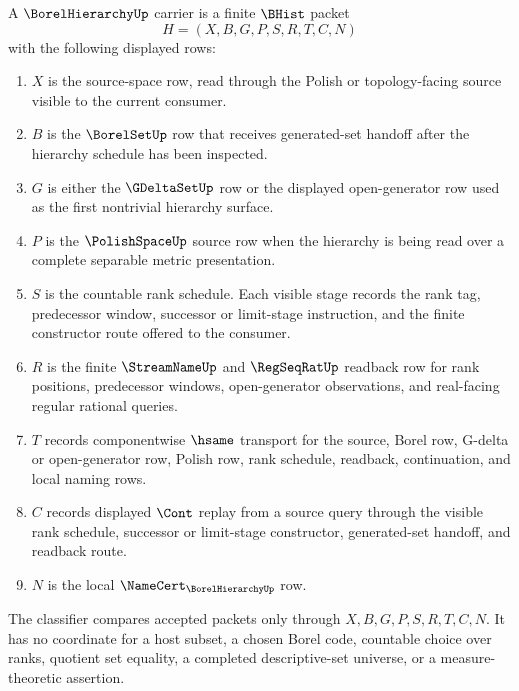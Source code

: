 \begin{definition}
\label{def:borel-hierarchy-carrier}
A $\BorelHierarchyUp$ carrier is a finite $\BHist$ packet
$$
H=(X,B,G,P,S,R,T,C,N)
$$
with the following displayed rows:
\begin{enumerate}
\item $X$ is the source-space row, read through the Polish or topology-facing source visible to the current consumer.
\item $B$ is the $\BorelSetUp$ row that receives generated-set handoff after the hierarchy schedule has been inspected.
\item $G$ is either the $\GDeltaSetUp$ row or the displayed open-generator row used as the first nontrivial hierarchy surface.
\item $P$ is the $\PolishSpaceUp$ source row when the hierarchy is being read over a complete separable metric presentation.
\item $S$ is the countable rank schedule. Each visible stage records the rank tag, predecessor window, successor or limit-stage instruction, and the finite constructor route offered to the consumer.
\item $R$ is the finite $\StreamNameUp$ and $\RegSeqRatUp$ readback row for rank positions, predecessor windows, open-generator observations, and real-facing regular rational queries.
\item $T$ records componentwise $\hsame$ transport for the source, Borel row, G-delta or open-generator row, Polish row, rank schedule, readback, continuation, and local naming rows.
\item $C$ records displayed $\Cont$ replay from a source query through the visible rank schedule, successor or limit-stage constructor, generated-set handoff, and readback route.
\item $N$ is the local $\NameCert_{\BorelHierarchyUp}$ row.
\end{enumerate}
The classifier compares accepted packets only through $X,B,G,P,S,R,T,C,N$. It has no coordinate for a host subset, a chosen Borel code, countable choice over ranks, quotient set equality, a completed descriptive-set universe, or a measure-theoretic assertion.
\end{definition}

